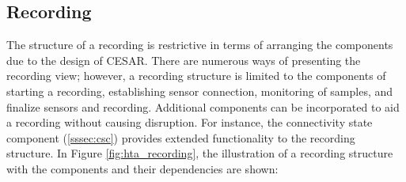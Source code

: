 
\subsection{Recording}
The structure of a recording is restrictive in terms of arranging the components due to the design of CESAR. There are numerous ways of presenting the recording view; however, a recording structure is limited to the components of starting a recording, establishing sensor connection, monitoring of samples, and finalize sensors and recording. Additional components can be incorporated to aid a recording without causing disruption. For instance, the connectivity state component (\ref{sssec:csc}) provides extended functionality to the recording structure. In Figure \ref{fig:hta_recording}, the illustration of a recording structure with the components and their dependencies are shown:

